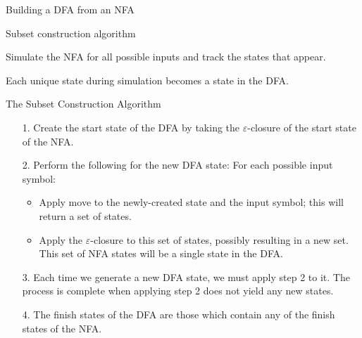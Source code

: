 \documentclass{plt}
\def\filled#1{\ifx#11mRed\else white\fi}
\begin{document}
\begin{frame}{Building a DFA from an NFA}

Subset construction algorithm

Simulate the NFA for all possible inputs and track the states that
appear.

Each unique state during simulation becomes a state in the DFA.

\end{frame}

\begin{frame}{The Subset Construction Algorithm}

\begin{itemize}
\item[1.] Create the start state of the DFA by taking the $\varepsilon$-closure of the start state of the NFA.

\item[2.] Perform the following for the new DFA state: 
For each possible input symbol:

\begin{itemize}
\item Apply move to the newly-created state and the input symbol; this will return a set of states.
\item Apply the $\varepsilon$-closure to this set of states, possibly resulting in a new set.
This set of NFA states will be a single state in the DFA.
\end{itemize}

\item[3.] Each time we generate a new DFA state, we must apply step 2 to it. The process is complete when applying step 2 does not yield any new states.

\item[4.] The finish states of the DFA are those which contain any of the finish states of the NFA.
\end{itemize}

\end{frame}


\def\aabbz#1#2#3#4#5#6#7#8#9{
\begin{scope}[node distance=3pt and 2pt,
                      every state/.style={inner sep=1pt,
                        fill=white,
                        minimum size=5pt}]
    \node [state,fill=\filled#2] at ($(#1)+(left:1)$) (0) {};
    \node [state,fill=\filled#3,right=of 0] (1) {};
    \node [state,fill=\filled#4,above right=of 1] (2) {};
    \node [state,fill=\filled#5,right=of 2] (3) {};
    \node [state,fill=\filled#6,below right=of 1] (4) {};
    \node [state,fill=\filled#7,right=of 4] (5) {};
    \node [state,fill=\filled#8,below right=of 3] (6) {};
    \node [state,fill=\filled#9,right=of 6] (7) {};
\aabbztwo
}
\end{document}
